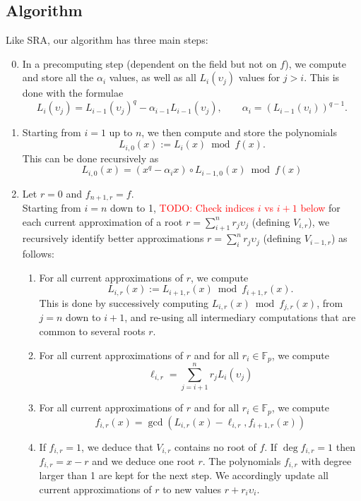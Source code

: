 \documentclass{sig-alternate}
\newcounter{algo}
\newcommand{\todo}[1]{\textcolor{red}{TODO: #1}}
\begin{document}
\subsection{Algorithm\label{sec:alg:alg}}
Like SRA, our algorithm has three main steps:
\begin{enumerate}
\setcounter{enumi}{-1}
\item In a precomputing step (dependent on the field but not on $f$), we compute and store all the $\alpha_i$ values, as well as all $L_i(\upsilon_{j})$ values for $j>i$. This is done with the formulae  
$$L_i(\upsilon_j)=L_{i-1}(\upsilon_j)^q-\alpha_{i-1}L_{i-1}(\upsilon_j), \qquad \alpha_i=(L_{i-1}(\upsilon_i))^{q-1}.$$
\item Starting from $i=1$ up to $n$, we then compute and store the polynomials
$$L_{i,0}(x):=L_i(x)\bmod f(x).$$
This can be done recursively as
$$L_{i,0}(x)=(x^q-\alpha_ix)\circ L_{i-1,0}(x)\bmod f(x)$$
\item 	Let $r=0$ and $f_{n+1,r}=f$. \\
Starting from $i=n$ down to 1, \todo{Check indices $i$ vs $i+1$ below} for each current approximation of a root $r=\sum_{i+1}^nr_j\upsilon_j$ (defining $V_{i,r}$), we recursively identify better approximations $r=\sum_{i}^nr_j\upsilon_j$ (defining $V_{i-1,r}$) as follows:
	\begin{enumerate}
	\item For all current approximations of $r$, we compute 
	$$L_{i,r}(x):=L_{i+1,r}(x)\bmod f_{i+1,r}(x).$$
	This is done by successively computing $L_{i,r}(x)\bmod f_{j,r}(x)$, from $j=n$ down to $i+1$, and re-using all intermediary computations that are common to several roots $r$.

	\item For all current approximations of $r$ and for all $r_i\in\mathbb{F}_p$, we compute 
	$$\ell_{i,r}=\sum_{j=i+1}^nr_jL_i(\upsilon_j)$$

	\item For all current approximations of $r$ and for all $r_i\in\mathbb{F}_p$, we compute 
	$$f_{i,r}(x)=\gcd(L_{i,r}(x)-\ell_{i,r},f_{i+1,r}(x))$$
	
	\item If $f_{i,r}=1$, we deduce that $V_{i,r}$ contains no root of $f$. If $\deg f_{i,r}=1$ then $f_{i,r}=x-r$ and we deduce one root $r$. The polynomials $f_{i,r}$ with degree larger than 1 are kept for the next step. We accordingly update all current approximations of $r$ to new values $r+r_i\upsilon_i$.

	\end{enumerate}

\end{enumerate}
\end{document}
